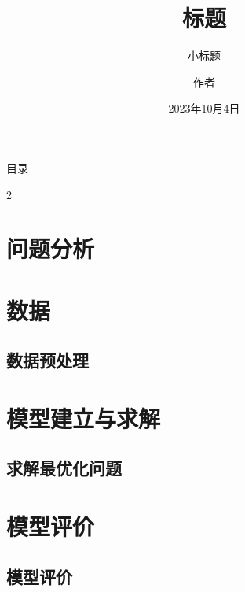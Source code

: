 \documentclass[aspectratio=16 9,10pt]{beamer}
\title{标题}
\subtitle{小标题}
\institute{\textbf{HITSZ}}
\author{作者}
\date{2023年10月4日}
\begin{document}
\begin{frame}
    \titlepage
\end{frame}
\begin{frame}{目录}
\begin{multicols}{2}
    \tableofcontents[hideallsubsections]
\end{multicols}
\end{frame}    
    
\section{问题分析}

\section{数据}
\subsection{数据预处理}

\section{模型建立与求解}

\subsection{求解最优化问题}



\section{模型评价}
\subsection{模型评价}
\end{document}
